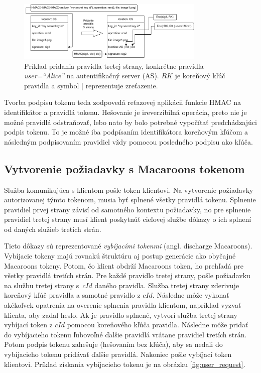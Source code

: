\begin{figure}
    \centerline{\includegraphics[width=0.8\textwidth]{images/3rd_party_caveat}}
    \caption[Pridanie pravidla tretej strany]{Príklad pridania pravidla tretej strany, konkrétne pravidla \textit{user=``Alice''} na autentifikačný server (AS). $RK$ je koreňový kľúč pravidla a symbol | reprezentuje zreťazenie.}
    \label{fig:add_caveat}
\end{figure}

Tvorba podpisu tokenu teda zodpovedá reťazovej aplikácii funkcie HMAC na identifikátor a pravidlá tokenu. Hešovanie je ireverzibilná operácia, preto nie je možné pravidlá odstraňovať, lebo nato by bolo potrebné vypočítať predchádzajúci podpis tokenu. To je možné iba podpísaním identifikátora koreňovým kľúčom a následným podpisovaním pravidiel vždy pomocou posledného podpisu ako kľúča.

\subsection{Vytvorenie požiadavky s Macaroons tokenom}
\label{sec:macaroon_request}

Služba komunikujúca s klientom pošle token klientovi. Na vytvorenie požiadavky autorizovanej týmto tokenom, musia byť splnené všetky pravidlá tokenu. Splnenie pravidiel prvej strany závisí od samotného kontextu požiadavky, no pre splnenie pravidiel tretej strany musí klient poskytnúť cieľovej službe dôkazy o ich splnení od daných služieb tretích strán.

Tieto dôkazy sú reprezentované \textit{vybíjacími tokenmi} (angl. discharge Macaroons). Vybíjacie tokeny majú rovnakú štruktúru aj postup generácie ako obyčajné Macaroons tokeny. Potom, čo klient obdrží Macaroons token, ho prehľadá pre všetky pravidlá tretích strán. Pre každé pravidlo tretej strany, pošle požiadavku na službu tretej strany s~$cId$ daného pravidla. Služba tretej strany zderivuje koreňový kľúč pravidla a samotné pravidlo z $cId$. Následne môže vykonať akékoľvek opatrenia na overenie splnenia pravidla klientom, napríklad vyzvať klienta, aby zadal heslo. Ak je pravidlo splnené, vytvorí služba tretej strany vybíjací token z $cId$ pomocou koreňového kľúča pravidla. Následne môže pridať do vybíjacieho tokenu ľubovoľné ďalšie pravidlá vrátane pravidiel tretích strán. Potom podpis tokenu zahešuje (hešovaním bez kľúča), aby sa nedali do vybíjacieho tokenu pridávať ďalšie pravidlá. Nakoniec pošle vybíjací token klientovi. Príklad získania vybíjacieho tokenu je na obrázku \ref{fig:user_request}.

